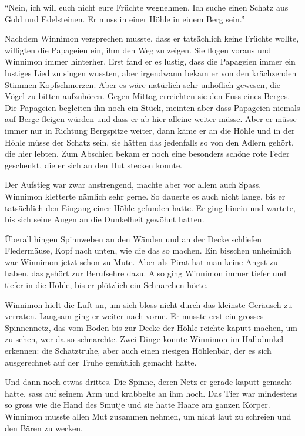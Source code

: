 \enquote{Nein, ich will euch nicht eure Früchte wegnehmen. Ich suche einen Schatz aus Gold und Edelsteinen. Er muss in einer Höhle in einem Berg sein.}

Nachdem Winnimon versprechen musste, dass er tatsächlich keine Früchte wollte, willigten die Papageien ein, ihm den Weg zu zeigen. Sie flogen voraus und Winnimon immer hinterher. Erst fand er es lustig, dass die Papageien immer ein lustiges Lied zu singen wussten, aber irgendwann bekam er von den krächzenden Stimmen Kopfschmerzen. Aber es wäre natürlich sehr unhöflich gewesen, die Vögel zu bitten aufzuhören. Gegen Mittag erreichten sie den Fuss eines Berges. Die Papageien begleiten ihn noch ein Stück, meinten aber dass Papageien niemals auf Berge fleigen würden und dass er ab hier alleine weiter müsse. Aber er müsse immer nur in Richtung Bergspitze weiter, dann käme er an die Höhle und in der Höhle müsse der Schatz sein, sie hätten das jedenfalls so von den Adlern gehört, die hier lebten. Zum Abschied bekam er noch eine besonders schöne rote Feder geschenkt, die er sich an den Hut stecken konnte.

Der Aufstieg war zwar anstrengend, machte aber vor allem auch Spass. Winnimon kletterte nämlich sehr gerne. So dauerte es auch nicht lange, bis er tatsächlich den Eingang einer Höhle gefunden hatte. Er ging hinein und wartete, bis sich seine Augen an die Dunkelheit gewöhnt hatten.

Überall hingen Spinnweben an den Wänden und an der Decke schliefen Fledermäuse, Kopf nach unten, wie die das so machen. Ein bisschen unheimlich war Winnimon jetzt schon zu Mute. Aber als Pirat hat man keine Angst zu haben, das gehört zur Berufsehre dazu. Also ging Winnimon immer tiefer und tiefer in die Höhle, bis er plötzlich ein Schnarchen hörte. 

Winnimon hielt die Luft an, um sich bloss nicht durch das kleinste Geräusch zu verraten. Langsam ging er weiter nach vorne. Er musste erst ein grosses Spinnennetz, das vom Boden bis zur Decke der Höhle reichte kaputt machen, um zu sehen, wer da so schnarchte. Zwei Dinge konnte Winnimon im Halbdunkel erkennen: die Schatztruhe, aber auch einen riesigen Höhlenbär, der es sich ausgerechnet auf der Truhe gemütlich gemacht hatte.

Und dann noch etwas drittes. Die Spinne, deren Netz er gerade kaputt gemacht hatte, sass auf seinem Arm und krabbelte an ihm hoch. Das Tier war mindestens so gross wie die Hand des Smutje und sie hatte Haare am ganzen Körper. Winnimon musste allen Mut zusammen nehmen, um nicht laut zu schreien und den Bären zu wecken.

